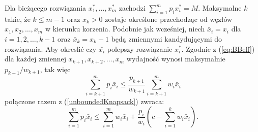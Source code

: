 Dla bieżącego rozwiązania $x_1^*,\dots,x_m^*$ zachodzi $\sum_{i=1}^m p_ix_i^* = M$. Maksymalne $k$ takie, że $ k \le m - 1$ oraz $x_k > 0$ zostaje określone przechodząc od węzłów $x_1,x_2,\dots,x_m$ w kierunku korzenia. Podobnie jak wcześniej, niech $\bar{x}_i = x_i$ dla $i=1,2,\dots,k-1$ oraz $\bar{x}_k = x_k -1$ będą zmiennymi kandydującymi do rozwiązania. Aby okreslić czy $\bar{x_i}$ polepszy rozwiązanie $x_i^*$. Zgodnie z (\cref{eq:BBeff}) dla każdej zmiennej $x_{k+1}, x_{k+2}, \dots, x_m$ wydajność wynosi maksymalnie $p_{k+1}/w_{k+1}$, tak więc
\begin{equation*}
  \sum_{i=k+1}^m p_i\bar{x}_i \le \frac{p_{k+1}}{w_{k+1}}\sum_{i=k+1}^m w_i \bar{x}_i
\end{equation*}
połączone razem z (\cref{unboundedKnapsack}) zwraca:
\begin{equation}
  \sum_{i=1}^m p_i\bar{x}_i \le \sum_{i=1}^m w_i \bar{x}_i + \frac{p_i}{w_{i}}( c - \sum_{i=1}^k w_i\bar{x}_i ).
\end{equation}


